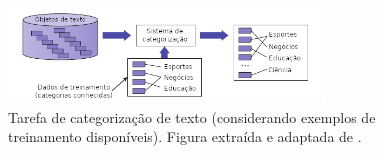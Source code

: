 \begin{figure}[h]
    \centering
    \includegraphics[width=0.75\textwidth]{img/figure15-1-zhai-traduzido.png}
    \caption{Tarefa de categorização de texto (considerando exemplos de treinamento disponíveis). Figura extraída e adaptada de .}
    \label{fig:categorização-de-texto-zhai2016}
\end{figure}